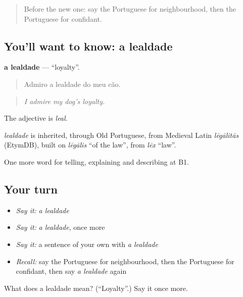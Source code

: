 \label{lesson:PT-C498-lealdade}



\begin{quote}
Before the new one: say the Portuguese for neighbourhood, then the Portuguese for confidant.
\end{quote}

\subsection*{You'll want to know: a lealdade}
\textbf{a lealdade} — \textquotedblleft{}loyalty\textquotedblright{}.

\begin{quote}
Admiro a lealdade do meu cão.
\end{quote}

\begin{quote}
\emph{I admire my dog's loyalty.}
\end{quote}

The adjective is \emph{leal}.

\begin{cousinweb}
\emph{lealdade} is inherited, through Old Portuguese, from Medieval Latin \emph{lēgālitās} (EtymDB), built on \emph{lēgālis} \textquotedblleft{}of the law\textquotedblright{}, from \emph{lēx} \textquotedblleft{}law\textquotedblright{}.
\end{cousinweb}

\begin{grammarlens}[title={What you've built}]
One more word for telling, explaining and describing at B1.
\end{grammarlens}

\subsection*{Your turn}
\begin{itemize}
\raggedright
  \item \emph{Say it:} \emph{a lealdade}
  \item \emph{Say it:} \emph{a lealdade}, once more
  \item \emph{Say it:} a sentence of your own with \emph{a lealdade}
  \item \emph{Recall:} say the Portuguese for neighbourhood, then the Portuguese for confidant, then say \emph{a lealdade} again
\end{itemize}

\begin{tcolorbox}[breakable,colback=teal!4,colframe=teal!35!black,title={Before you move on}]
What does a lealdade mean? (\textquotedblleft{}Loyalty\textquotedblright{}.) Say it once more.
\end{tcolorbox}
